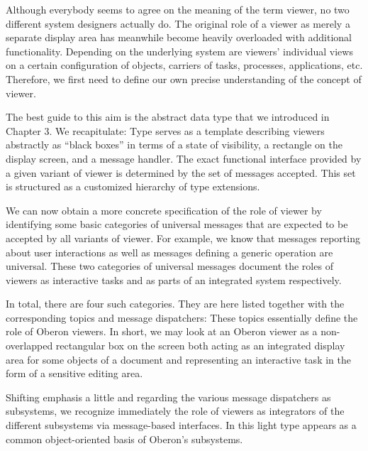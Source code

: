 Although everybody seems to agree on the meaning of the term viewer,
no two different system designers actually do. The original role of a
viewer as merely a separate display area has meanwhile become heavily
overloaded with additional functionality. Depending on the underlying
system are viewers' individual views on a certain configuration of
objects, carriers of tasks, processes, applications, etc. Therefore,
we first need to define our own precise understanding of the concept
of viewer.

The best guide to this aim is the abstract data type  that we
introduced in Chapter 3. We recapitulate: Type  serves as a
template describing viewers abstractly as ``black boxes'' in terms of a
state of visibility, a rectangle on the display screen, and a message
handler. The exact functional interface provided by a given variant of
viewer is determined by the set of messages accepted. This set is
structured as a customized hierarchy of type extensions.

We can now obtain a more concrete specification of the role of viewer
by identifying some basic categories of universal messages that are
expected to be accepted by all variants of viewer. For example, we
know that messages reporting about user interactions as well as
messages defining a generic operation are universal. These two
categories of universal messages document the roles of viewers as
interactive tasks and as parts of an integrated system respectively.

In total, there are four such categories. They are here listed
together with the corresponding topics and message dispatchers:
\medskip
{}
\medskip
These topics essentially define the role of Oberon viewers. In short,
we may look at an Oberon viewer as a non-overlapped rectangular box on
the screen both acting as an integrated display area for some objects
of a document and representing an interactive task in the form of a
sensitive editing area.

Shifting emphasis a little and regarding the various message
dispatchers as subsystems, we recognize immediately the role of
viewers as integrators of the different subsystems via message-based
interfaces. In this light type  appears as a common
object-oriented basis of Oberon's subsystems.

